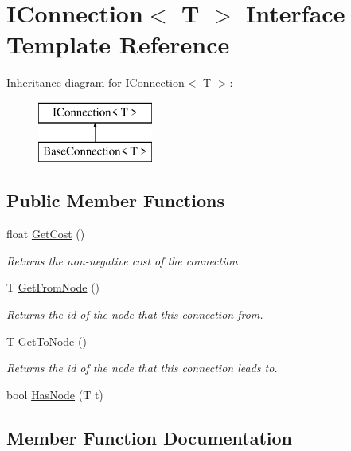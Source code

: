 \hypertarget{interface_i_connection}{}\section{I\+Connection$<$ T $>$ Interface Template Reference}
\label{interface_i_connection}
Inheritance diagram for I\+Connection$<$ T $>$\+:\begin{figure}[H]
\begin{center}
\leavevmode
\includegraphics[height=2.000000cm]{interface_i_connection}
\end{center}
\end{figure}
\subsection*{Public Member Functions}
\begin{DoxyCompactItemize}
\item 
float \mbox{\hyperlink{interface_i_connection_adf42d8cf17bee3b3b1ee299d6f9de1df}{Get\+Cost}} ()
\begin{DoxyCompactList}\small\item\em Returns the non-\/negative cost of the connection \end{DoxyCompactList}\item 
T \mbox{\hyperlink{interface_i_connection_acecfce42b26af8f2f83e3a806edc6910}{Get\+From\+Node}} ()
\begin{DoxyCompactList}\small\item\em Returns the id of the node that this connection from. \end{DoxyCompactList}\item 
T \mbox{\hyperlink{interface_i_connection_a738b6e5b2c2620e9e4a8a3e07fe85b52}{Get\+To\+Node}} ()
\begin{DoxyCompactList}\small\item\em Returns the id of the node that this connection leads to. \end{DoxyCompactList}\item 
bool \mbox{\hyperlink{interface_i_connection_a0789fc3877953a8da47402b986c8469d}{Has\+Node}} (T t)
\end{DoxyCompactItemize}


\subsection{Member Function Documentation}
\mbox{\label{interface_i_connection_adf42d8cf17bee3b3b1ee299d6f9de1df}} 
